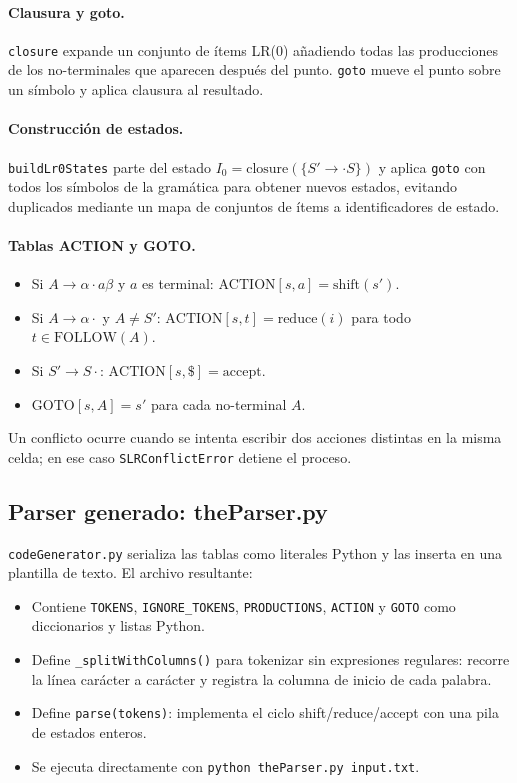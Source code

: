 \documentclass[11pt,a4paper]{article}
\begin{document}
\paragraph{Clausura y goto.} \texttt{closure} expande un conjunto de ítems
LR(0) añadiendo todas las producciones de los no-terminales que aparecen
después del punto. \texttt{goto} mueve el punto sobre un símbolo y aplica
clausura al resultado.

\paragraph{Construcción de estados.} \texttt{buildLr0States} parte del estado
$I_0 = \text{closure}(\{S' \rightarrow \cdot S\})$ y aplica \texttt{goto} con todos
los símbolos de la gramática para obtener nuevos estados, evitando duplicados
mediante un mapa de conjuntos de ítems a identificadores de estado.

\paragraph{Tablas ACTION y GOTO.}
\begin{itemize}[noitemsep]
  \item Si $A \to \alpha \cdot a \beta$ y $a$ es terminal: $\text{ACTION}[s,a] = \text{shift}(s')$.
  \item Si $A \to \alpha \cdot$ y $A \neq S'$: $\text{ACTION}[s,t] = \text{reduce}(i)$
        para todo $t \in \text{FOLLOW}(A)$.
  \item Si $S' \to S \cdot$: $\text{ACTION}[s,\$] = \text{accept}$.
  \item $\text{GOTO}[s, A] = s'$ para cada no-terminal $A$.
\end{itemize}
Un conflicto ocurre cuando se intenta escribir dos acciones distintas en la
misma celda; en ese caso \texttt{SLRConflictError} detiene el proceso.

\subsection{Parser generado: theParser.py}

\texttt{codeGenerator.py} serializa las tablas como literales Python y las
inserta en una plantilla de texto. El archivo resultante:

\begin{itemize}[noitemsep]
  \item Contiene \texttt{TOKENS}, \texttt{IGNORE\_TOKENS}, \texttt{PRODUCTIONS},
        \texttt{ACTION} y \texttt{GOTO} como diccionarios y listas Python.
  \item Define \texttt{\_splitWithColumns()} para tokenizar sin expresiones
        regulares: recorre la línea carácter a carácter y registra la columna
        de inicio de cada palabra.
  \item Define \texttt{parse(tokens)}: implementa el ciclo
        shift/reduce/accept con una pila de estados enteros.
  \item Se ejecuta directamente con \lstinline|python theParser.py input.txt|.
\end{itemize}
\end{document}
